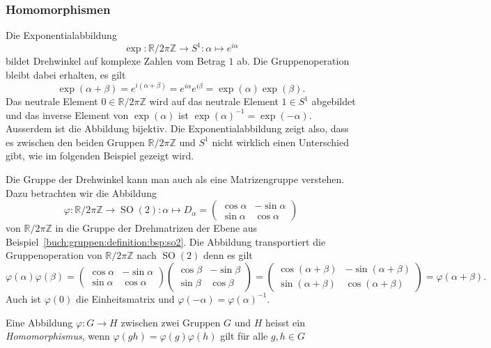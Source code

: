 %
%
\subsubsection{Homomorphismen}
Die Exponentialabbildung
\[
\exp
\colon
\mathbb{R}/2\pi\mathbb{Z} \to S^1
:
\alpha \mapsto e^{i\alpha}
\]
bildet Drehwinkel auf komplexe Zahlen vom Betrag $1$ ab.
Die Gruppenoperation bleibt dabei erhalten, es gilt
\[
\exp(\alpha + \beta)
=
e^{i(\alpha+\beta)}
=
e^{i\alpha}
e^{i\beta}
=
\exp(\alpha)
\exp(\beta).
\]
Das neutrale Element $0\in\mathbb{R}/2\pi\mathbb{Z}$ wird auf
das neutrale Element $1\in S^1$ abgebildet und das inverse
Element von $\exp(\alpha)$ ist
$ \exp(\alpha)^{-1} = \exp(-\alpha) $.
Ausserdem ist die Abbildung bijektiv.
Die Exponentialabbildung zeigt also, dass es zwischen den beiden
Gruppen $\mathbb{R}/2\pi\mathbb{Z}$ und $S^1$ nicht wirklich einen
Unterschied gibt, wie im folgenden Beispiel gezeigt wird.

Die Gruppe der Drehwinkel kann man auch als eine Matrizengruppe
verstehen.
Dazu betrachten wir die Abbildung
\[
\varphi
\colon
\mathbb{R}/2\pi\mathbb{Z}
\to
\operatorname{SO}(2)
:
\alpha
\mapsto
D_\alpha
=
\begin{pmatrix}
\cos\alpha & -\sin\alpha \\
\sin\alpha &  \cos\alpha
\end{pmatrix}
\]
von $\mathbb{R}/2\pi\mathbb{Z}$ in die Gruppe der Drehmatrizen der
Ebene aus Beispiel~\ref{buch:gruppen:definition:bsp:so2}.
Die Abbildung transportiert die Gruppenoperation von
$\mathbb{R}/2\pi\mathbb{Z}$ nach $\operatorname{SO}(2)$ denn es gilt
\[
\varphi(\alpha)\varphi(\beta)
=
\begin{pmatrix}
\cos\alpha & -\sin\alpha \\
\sin\alpha &  \cos\alpha
\end{pmatrix}
\begin{pmatrix}
\cos\beta & -\sin\beta \\
\sin\beta &  \cos\beta
\end{pmatrix}
=
\begin{pmatrix}
\cos(\alpha+\beta) & -\sin(\alpha+\beta) \\
\sin(\alpha+\beta) &  \cos(\alpha+\beta)
\end{pmatrix}
=
\varphi(\alpha+\beta).
\]
Auch ist $\varphi(0)$ die Einheitsmatrix und
$\varphi(-\alpha)=\varphi(\alpha)^{-1}$.

\begin{definition}[Homomorphismus]
\label{buch:gruppen:definition:def:homomorphismus}
Eine Abbildung $\varphi\colon G\to H$ zwischen zwei Gruppen $G$ und $H$
heisst ein {\em Homomorphismus}, wenn
$\varphi(gh)=\varphi(g)\varphi(h)$ gilt für alle $g,h\in G$
\end{definition}

